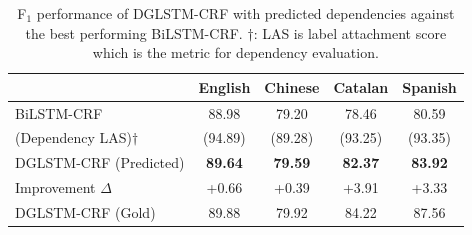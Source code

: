 \begin{table}[h!]
	\centering
	\begin{tabular}{lcccc}
		\toprule
		& \textbf{English} & \textbf{Chinese} & \textbf{Catalan} & \textbf{Spanish} \\
		\midrule
		BiLSTM-CRF & 88.98 & 79.20 & 78.46 & 80.59 \\
		\midrule
		(Dependency LAS)$\dagger$ & (94.89) & (89.28) & (93.25) & (93.35)\\
		DGLSTM-CRF (Predicted) & \textbf{89.64} & \textbf{79.59} & \textbf{82.37} & \textbf{83.92} \\
		Improvement $\Delta$ & +0.66 & +0.39 & +3.91 & +3.33\\
		\midrule \midrule
		DGLSTM-CRF (Gold) & 89.88 & 79.92 & 84.22 & 87.56 \\ 
		\bottomrule
	\end{tabular}
	\caption{F$_1$ performance of DGLSTM-CRF with predicted dependencies against the best performing BiLSTM-CRF. $\dagger$: LAS is label attachment score which is the metric for dependency evaluation.}
	\label{tab:dep_result}
\end{table}

